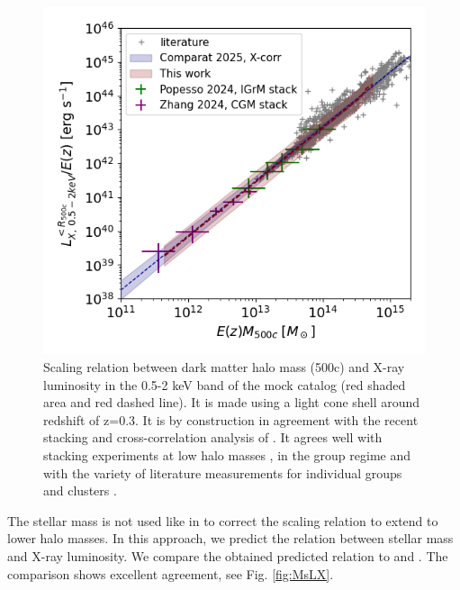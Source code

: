 \documentclass[twocolumn,iop]{openjournal}
\begin{document}
\begin{figure}
    \centering
    \includegraphics[width=0.95\linewidth]{figures_GAS/M500c_LX.png}
    \caption{Scaling relation between dark matter halo mass (500c) and X-ray luminosity in the 0.5-2 keV band of the mock catalog (red shaded area and red dashed line). 
    It is made using a light cone shell around redshift of z=0.3. 
    It is by construction in agreement with the recent stacking and cross-correlation analysis of \citet[][blue dashes and shaded area]{ComparatMerloniPonti_2025arXiv250319796C}. 
    It agrees well with stacking experiments at low halo masses \citep[][in purple]{ZhangComparatPonti_2024A&A...690A.268Z}, in the group regime \citep[][in green]{PopessoMariniDolag_2024arXiv241117120P} and with the variety of literature measurements for individual groups and clusters \citep[][in grey crosses]{LovisariReiprichSchellenberger_2015A&A...573A.118L, LovisariSchellenbergerSereno_2020ApJ...892..102L, MantzAllenMorris_2016MNRAS.456.4020M,AdamiGilesKoulouridis_2018A&A...620A...5A,SchellenbergerReiprich_2017MNRAS.469.3738S, BulbulChiuMohr_2019ApJ...871...50B, LiuBulbulGhirardini_2022A&A...661A...2L,BulbulLiuKluge_2024A&A...685A.106B}. }
    \label{fig:scaling:mass:luminosity}
\end{figure}

The stellar mass is not used like in \citet{SeppiComparatBulbul_2022A&A...665A..78S} to correct the scaling relation to extend to lower halo masses. In this approach, we predict the relation between stellar mass and X-ray luminosity. We compare the obtained predicted relation to \citet{AndersonGaspariWhite_2015MNRAS.449.3806A} and \citet{ZhangComparatPonti_2024A&A...690A.268Z}. The comparison shows excellent agreement, see Fig. \ref{fig:MsLX}.
\end{document}
